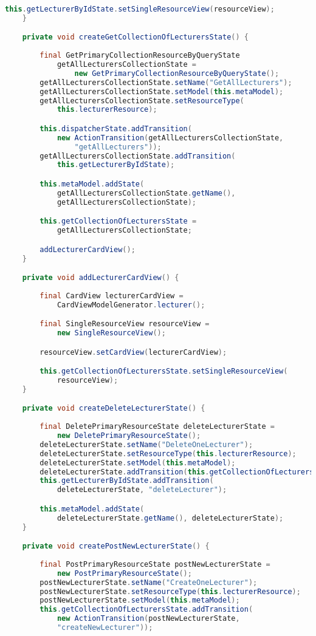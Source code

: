 \begin{lstlisting}[label=lst:enfield_model,
language=java,
firstnumber=1,
caption=Beschreibung des \textit{Enfield-Modell} der Referenzimplementierung. ]
		this.getLecturerByIdState.setSingleResourceView(resourceView);
	}

	private void createGetCollectionOfLecturersState() {
	
		final GetPrimaryCollectionResourceByQueryState
			getAllLecturersCollectionState = 
				new GetPrimaryCollectionResourceByQueryState();
		getAllLecturersCollectionState.setName("GetAllLecturers");
		getAllLecturersCollectionState.setModel(this.metaModel);
		getAllLecturersCollectionState.setResourceType(
			this.lecturerResource);

		this.dispatcherState.addTransition(
			new ActionTransition(getAllLecturersCollectionState, 
				"getAllLecturers"));
		getAllLecturersCollectionState.addTransition(
			this.getLecturerByIdState);

		this.metaModel.addState(
			getAllLecturersCollectionState.getName(), 
			getAllLecturersCollectionState);

		this.getCollectionOfLecturersState = 
			getAllLecturersCollectionState;

		addLecturerCardView();
	}

	private void addLecturerCardView() {
	
		final CardView lecturerCardView = 
			CardViewModelGenerator.lecturer();

		final SingleResourceView resourceView = 
			new SingleResourceView();

		resourceView.setCardView(lecturerCardView);

		this.getCollectionOfLecturersState.setSingleResourceView(
			resourceView);
	}

	private void createDeleteLecturerState() {
	
		final DeletePrimaryResourceState deleteLecturerState = 
			new DeletePrimaryResourceState();
		deleteLecturerState.setName("DeleteOneLecturer");
		deleteLecturerState.setResourceType(this.lecturerResource);
		deleteLecturerState.setModel(this.metaModel);
		deleteLecturerState.addTransition(this.getCollectionOfLecturersState, "getAllLecturers");
		this.getLecturerByIdState.addTransition(
			deleteLecturerState, "deleteLecturer");

		this.metaModel.addState(
			deleteLecturerState.getName(), deleteLecturerState);
	}

	private void createPostNewLecturerState() {
	
		final PostPrimaryResourceState postNewLecturerState = 
			new PostPrimaryResourceState();
		postNewLecturerState.setName("CreateOneLecturer");
		postNewLecturerState.setResourceType(this.lecturerResource);
		postNewLecturerState.setModel(this.metaModel);
		this.getCollectionOfLecturersState.addTransition(
			new ActionTransition(postNewLecturerState, 
			"createNewLecturer"));


\end{lstlisting}
